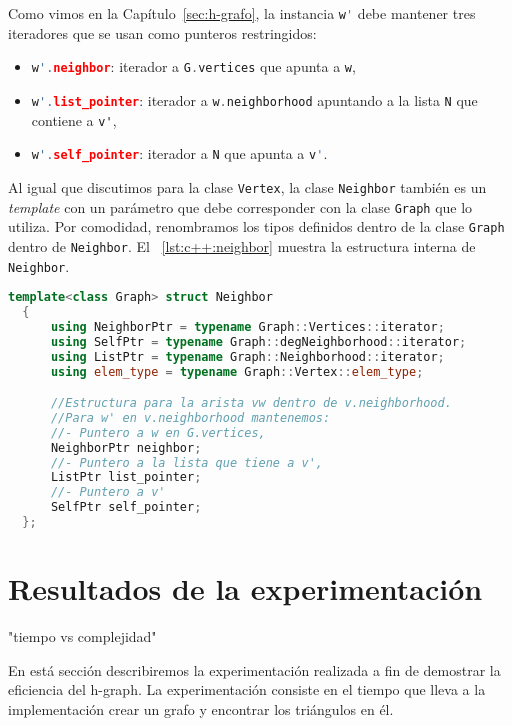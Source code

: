 \documentclass[%
    a4paper,%
    fontsize=12pt,%
    DIV=12,
    twoside,%
    openright,%
    titlepage=true,%
    headsepline,%
    toc=bibliography,%
    parskip=half,%
    cleardoublepage=empty,%
    headings=big,%
]{scrbook}
\makeatletter
\newcommand{\Code}[1]{\lstinline[basicstyle={\ttfamily}]@#1@}
\newcommand{\CPPCode}[1]{\lstinline[language=C++,basicstyle={\ttfamily}]@#1@}
\makeatother
\begin{document}
Como vimos en la Capítulo~\ref{sec:h-grafo}, la instancia \CPPCode{w'} debe mantener tres iteradores que se usan como punteros restringidos:
\begin{itemize}
  \item \CPPCode{w'.neighbor}: iterador a \CPPCode{G.vertices} que apunta a \CPPCode{w},

  \item \CPPCode{w'.list_pointer}: iterador a \CPPCode{w.neighborhood} apuntando a la lista \CPPCode{N} que contiene a \Code{v'},

  \item \CPPCode{w'.self_pointer}: iterador a \CPPCode{N} que apunta a \CPPCode{v'}.
\end{itemize}

Al igual que discutimos para la clase \CPPCode{Vertex}, la clase \CPPCode{Neighbor} también es un \emph{template} con un parámetro que debe corresponder con la clase \CPPCode{Graph} que lo utiliza.  Por comodidad, renombramos los tipos definidos dentro de la clase \CPPCode{Graph} dentro de \CPPCode{Neighbor}.  El \lstlistingname~\ref{lst:c++:neighbor} muestra la estructura interna de \CPPCode{Neighbor}.


\begin{lstlisting}[language={C++},caption={Neighbor.h},gobble=2,float=ht,label={lst:c++:neighbor}]
  template<class Graph> struct Neighbor
  {
      using NeighborPtr = typename Graph::Vertices::iterator;
      using SelfPtr = typename Graph::degNeighborhood::iterator;
      using ListPtr = typename Graph::Neighborhood::iterator;
      using elem_type = typename Graph::Vertex::elem_type;

      //Estructura para la arista vw dentro de v.neighborhood.
      //Para w' en v.neighborhood mantenemos:
      //- Puntero a w en G.vertices, 
      NeighborPtr neighbor;
      //- Puntero a la lista que tiene a v', 
      ListPtr list_pointer;
      //- Puntero a v'
      SelfPtr self_pointer;
  };
\end{lstlisting}

\chapter{Resultados de la experimentación}
\label{sec:experimentación}
"tiempo vs complejidad"

En está sección describiremos la experimentación realizada a fin de demostrar la eficiencia del h-graph. La experimentación consiste en el tiempo que lleva a la implementación crear un grafo y encontrar los triángulos en él.
\end{document}
